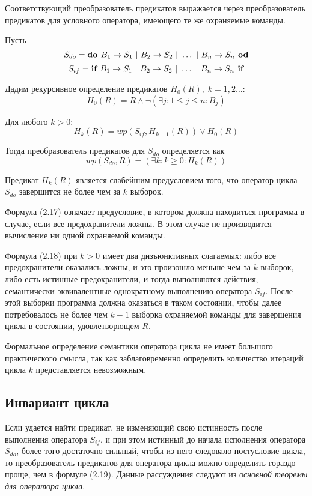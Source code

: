 Соответствующий преобразователь предикатов выражается через преобразователь предикатов
для условного оператора, имеющего те же охраняемые команды.

Пусть
\begin{equation}
	S_{do} = \textbf{do } B_1 \rightarrow S_1 \text{ | } B_2 \rightarrow S_2 \text{ | } \ldots \text{ | } B_n \rightarrow S_n \textbf{ od}
\end{equation}
\begin{equation}
	S_{if} = \textbf{if } B_1 \rightarrow S_1 \text{ | } B_2 \rightarrow S_2 \text{ | } \ldots \text{ | } B_n \rightarrow S_n \textbf{ if}
\end{equation}

Дадим рекурсивное определение предикатов $H_0(R), \; k = 1, 2\ldots$:
\begin{equation}
	H_0(R) = R \wedge \neg (\exists j: 1 \leq j \leq n: B_j)
\end{equation}
\item Для любого $k > 0$:
\begin{equation}
	H_k(R) = wp(S_{if}, H_{k-1}(R)) \vee H_0(R)
\end{equation}

Тогда преобразователь предикатов для $S_{do}$ определяется как
\begin{equation}
	wp(S_{do}, R) = (\exists k: k \geq 0: H_k(R))
\end{equation}

Предикат $H_k(R)$ является слабейшим предусловием того, что оператор цикла $S_{do}$ завершится не более
чем за $k$ выборок.

Формула (2.17) означает предусловие, в котором должна находиться программа в случае, если все предохранители ложны.
В этом случае не производится вычисление ни одной охраняемой команды.

Формула (2.18) при $k>0$ имеет два дизъюнктивных слагаемых: либо все предохранители оказались ложны, и это произошло меньше чем за $k$ выборок,
либо есть истинные предохранители, и тогда выполняются действия, семантически эквивалентные однократному выполнению оператора $S_{if}$.
После этой выборки
программа должна оказаться в таком состоянии, чтобы далее потребовалось не более чем $k - 1$ выборка охраняемой команды для
завершения цикла в состоянии, удовлетворющем $R$.

Формальное определение семантики оператора цикла не имеет большого практического смысла, так как
заблаговременно определить количество итераций цикла $k$ представляется невозможным. 

\subsection{Инвариант цикла}
Если удается найти предикат, не изменяющий свою истинность после выполнения оператора $S_{if}$, и при этом
истинный до начала исполнения оператора $S_{do}$, более того достаточно сильный, чтобы
из него следовало постусловие цикла, то преобразователь предикатов для оператора цикла
можно определить гораздо проще, чем в формуле (2.19). Данные рассуждения следуют из \textit{основной теоремы для оператора цикла}.

